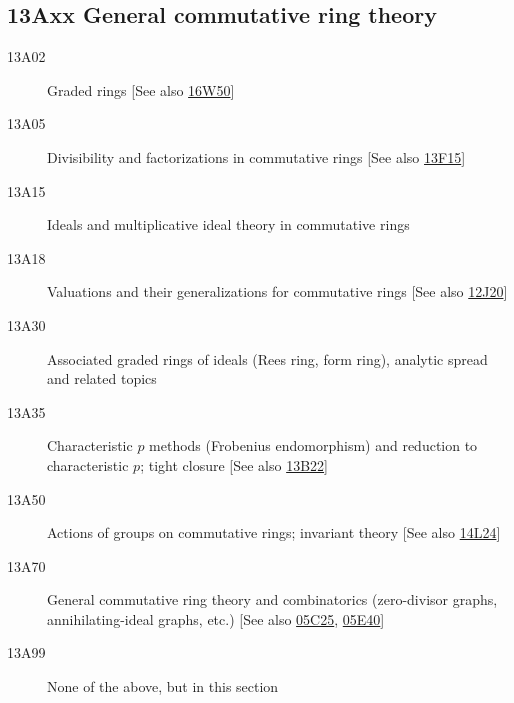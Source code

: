\documentclass[letterpaper]{article}
\begin{document}
\subsection*{13Axx General commutative ring theory }\label{13Axx}
\begin{description}               
\item [13A02]\label{13A02} Graded rings [See also \hyperref[16W50]{16W50}]
\item [13A05]\label{13A05} Divisibility and factorizations in commutative rings [See also \hyperref[13F15]{13F15}]
\item [13A15]\label{13A15} Ideals and multiplicative ideal theory in commutative rings
\item [13A18]\label{13A18} Valuations and their generalizations for commutative rings [See also \hyperref[12J20]{12J20}]
\item [13A30]\label{13A30} Associated graded rings of ideals (Rees ring, form ring), analytic spread and related topics
\item [13A35]\label{13A35} Characteristic $p$ methods (Frobenius endomorphism) and reduction to characteristic $p$; tight closure [See also \hyperref[13B22]{13B22}]
\item [13A50]\label{13A50} Actions of groups on commutative rings; invariant theory [See also \hyperref[14L24]{14L24}]
\item [13A70]\label{13A70} General commutative ring theory and combinatorics (zero-divisor graphs, annihilating-ideal graphs, etc.) [See also \hyperref[05C25]{05C25}, \hyperref[05E40]{05E40}]
\item [13A99]\label{13A99} None of the above, but in this section
\end{description}          
\end{document}

